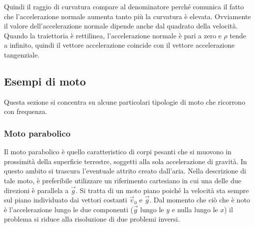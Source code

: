 \documentclass[10pt,a4paper]{book}
\begin{document}
Quindi il raggio di curvatura compare al denominatore perché comunica il fatto che l'accelerazione normale aumenta tanto più la curvatura è elevata. Ovviamente il valore dell'accelerazione normale dipende anche dal quadrato della velocità. Quando la traiettoria è rettilinea, l'accelerazione normale è pari a zero e $\rho$ tende a infinito, quindi il vettore accelerazione coincide con il vettore accelerazione tangenziale.

\subsection{Esempi di moto}

Questa sezione si concentra su alcune particolari tipologie di moto che ricorrono con frequenza.

\subsubsection{Moto parabolico}

Il moto parabolico è quello caratteristico di corpi pesanti che si muovono in prossimità della superficie terrestre, soggetti alla sola accelerazione di gravità. In questo ambito si trascura l'eventuale attrito creato dall'aria.
Nella descrizione di tale moto, è preferibile utilizzare un riferimento cartesiano in cui una delle due direzioni è parallela a $\vec{g}$. Si tratta di un moto piano poiché la velocità sta sempre sul piano individuato dai vettori costanti $\vec{v}_0$ e $\vec{g}$. Dal momento che ciò che è noto è l'accelerazione lungo le due componenti ($\vec{g}$ lungo le $y$ e nulla lungo le $x$) il problema si riduce alla risoluzione di due problemi inversi.
\end{document}
